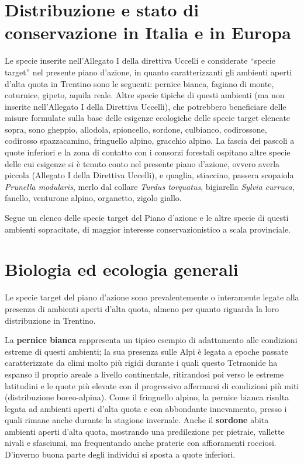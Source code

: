 \documentclass[10pt,twoside,openany,x11names,svgnames,italian,a5paper,dvipsnames,table]{memoir}
\newcommand\chapterillustration{}
\begin{document}
\newpage
\section{Distribuzione e stato di conservazione in Italia e in Europa}
Le specie inserite nell’Allegato I della direttiva Uccelli e considerate “specie target” nel presente piano d'azione, in quanto caratterizzanti gli ambienti aperti d’alta quota in Trentino sono le seguenti: pernice bianca, fagiano di monte, coturnice, gipeto, aquila reale. 
Altre specie tipiche di questi ambienti (ma non inserite nell'Allegato I della Direttiva Uccelli), che potrebbero beneficiare delle misure formulate sulla base delle esigenze ecologiche delle specie target elencate sopra, sono gheppio, allodola, spioncello, sordone, culbianco, codirossone, codirosso spazzacamino, fringuello alpino, gracchio alpino. La fascia dei pascoli a quote inferiori e la zona di contatto con i consorzi forestali ospitano altre specie delle cui esigenze si è tenuto conto nel presente piano d’azione, ovvero averla piccola (Allegato I della Direttiva Uccelli), e quaglia, stiaccino, passera scopaiola \emph{Prunella modularis}, merlo dal collare \emph{Turdus torquatus}, bigiarella \emph{Sylvia curruca}, fanello, venturone alpino, organetto, zigolo giallo.

Segue un elenco delle specie target del Piano d’azione e le altre specie di questi ambienti sopracitate, di maggior interesse conservazionistico a scala provinciale.


\section{Biologia ed ecologia generali}
\renewcommand\chapterillustration{1.JPG}

Le specie target del piano d'azione sono prevalentemente o interamente legate alla presenza di ambienti aperti d’alta quota, almeno per quanto riguarda la loro distribuzione in Trentino. 


La \textbf{pernice bianca} rappresenta un tipico esempio di adattamento alle condizioni estreme di questi ambienti; la sua presenza sulle Alpi è legata a epoche passate caratterizzate da climi molto più rigidi durante i quali questo Tetraonide ha espanso il proprio areale a livello continentale, ritirandosi poi verso le estreme latitudini e le quote più elevate con il progressivo affermarsi di condizioni più miti (distribuzione boreo-alpina). Come il fringuello alpino, la pernice bianca risulta legata ad ambienti aperti d’alta quota e con abbondante innevamento, presso i quali rimane anche durante la stagione invernale. Anche il \textbf{sordone} abita ambienti aperti d’alta quota, mostrando una predilezione per pietraie, vallette nivali e sfasciumi, ma frequentando anche praterie con affioramenti rocciosi. D’inverno buona parte degli individui si sposta a quote inferiori.
\end{document}
